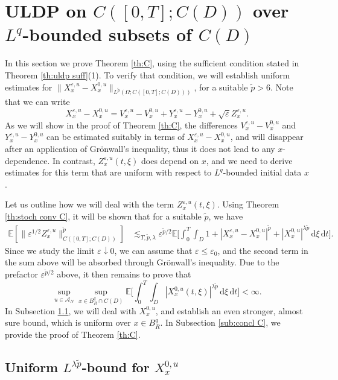 \documentclass[10pt,a4paper]{amsart}
\numberwithin{equation}{section}
\newcommand{\Cper}{C(D)}
\newcommand{\E}{{\mathbb E}}
\newcommand{\eps}{\varepsilon}
\newcommand{\Om}{\Omega}
\newcommand{\A}{{\mathcal A}}
\newcommand{\dd}{\,\mathrm{d}}
\begin{document}
\section{ULDP on $C([0,T];\Cper)$ over $L^q$-bounded subsets of $\Cper$}\label{sec:C}

In this section we prove Theorem \ref{th:C}, using the sufficient condition stated in Theorem \ref{th:uldp suff}(1). 
To verify that condition, we will establish uniform estimates for $\|X_x^{\eps,u}-X_x^{0,u}\|_{L^{\tilde p}(\Om;C([0,T];\Cper))}$, for a suitable $\tilde p>6$. Note that we can write
\[
X_x^{\eps,u}-X_x^{0,u}=V_x^{\eps,u}-V_x^{0,u}+Y_x^{\eps,u}-Y_x^{0,u}+\sqrt{\eps}Z_x^{\eps,u}. 
\] 
As we will show in the proof of Theorem \ref{th:C}, the differences $V_x^{\eps,u}-V_x^{0,u}$ and $Y_x^{\eps,u}-Y_x^{0,u}$ can be estimated suitably in terms of $X_x^{\eps,u}-X_x^{0,u}$, and will disappear after an application of  Gr\"onwall's inequality, thus it does not lead to any $x$-dependence. In contrast, $Z_x^{\eps,u}(t,\xi)$ does depend on $x$, and we need to derive   estimates  for this term that are uniform with respect to $L^q$-bounded initial data $x$. 

Let us outline how we will deal with the term  $Z_x^{\eps,u}(t,\xi)$. 
Using Theorem \ref{th:stoch conv C}, it will be shown that for a suitable $\tilde p$, we have
\begin{align*}
\E[\|\eps^{1/2}Z_x^{\eps,u} \|_{C([0,T];C(D))}^{\tilde p}]
&\lesssim_{T, \tilde p,\lambda}\eps^{\tilde p/2}\E\Big[\int_0^T\int_D 1+ |X_x^{\eps,u}-X_x^{0,u}|^{\tilde p}+|X_x^{0,u}|^{\lambda \tilde p}\dd\xi\dd t\Big].  
\end{align*} 
Since we study the limit $\eps\downarrow 0$, we can assume that $\eps\leq \eps_0$, and the second term in the sum above will be absorbed through Gr\"onwall's inequality. 
Due to the prefactor $\eps^{\tilde p/2}$ above, it then remains to prove that  
\begin{equation*} 
  \sup_{u\in\A_N}\sup_{x\in B_R^q\cap C(D)} \E\Big[\int_0^T\int_D  |X_x^{0,u}(t,\xi)|^{\lambda \tilde p}\dd\xi\dd t\Big]<\infty.
\end{equation*} 
In Subsection \ref{sub:I2 C}, we will deal with $X_x^{0,u}$, and establish an even stronger, almost sure bound, which is uniform over $x\in B^q_R$. In Subsection \ref{sub:concl C}, we provide the proof of Theorem \ref{th:C}. 



\subsection{Uniform $L^{\lambda\tilde p}$-bound for $X_x^{0,u}$}\label{sub:I2 C}
\end{document}
